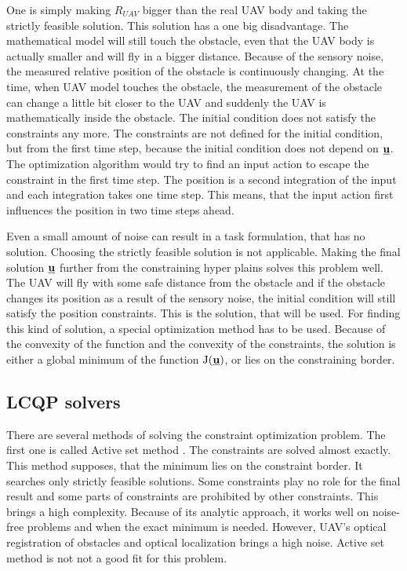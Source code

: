 \documentclass[a4paper,11pt,titlepage]{article}
\newcommand{\uvec}{\textbf{\underline{u}}}
\newcommand{\macJ}{\mathrm{J}(\uvec)}
\begin{document}
One is simply making $R_{UAV}$ bigger than the real UAV body and taking the strictly feasible solution. This solution has a one big disadvantage. The mathematical model will still touch the obstacle, even that the UAV body is actually smaller and will fly in a bigger distance. Because of the sensory noise, the measured relative position of the obstacle is continuously changing. At the time, when UAV model touches the obstacle, the measurement of the obstacle can change a little bit closer to the UAV and suddenly the UAV is mathematically inside the obstacle. The initial condition does not satisfy the constraints any more. The constraints are not defined for the initial condition, but from the first time step, because the initial condition does not depend on $\uvec$. The optimization algorithm would try to find an input action to escape the constraint in the first time step. The position is a second integration of the input and each integration takes one time step. This means, that the input action first influences the position in two time steps ahead. 

Even a small amount of noise can result in a task formulation, that has no solution. Choosing the strictly feasible solution is not applicable. Making the final solution $\uvec$ further from the constraining hyper plains solves this problem well. The UAV will fly with some safe distance from the obstacle and if the obstacle changes its position as a result of the sensory noise, the initial condition will still satisfy the position constraints. This is the solution, that will be used. For finding this kind of solution, a special optimization method has to be used. Because of the convexity of the function and the convexity of the constraints, the solution is either a global minimum of the function $\macJ$, or lies on the constraining border.

\subsection{LCQP solvers}


There are several methods of solving the constraint optimization problem.
The first one is called Active set method \cite{schittkowski1983convergence}. The constraints are solved almost exactly. This method supposes, that the minimum lies on the constraint border. It searches only strictly feasible solutions. Some constraints play no role for the final result and some parts of constraints are prohibited by other constraints. This brings a high complexity. Because of its analytic approach, it works well on noise-free problems and when the exact minimum is needed. However, UAV's optical registration of obstacles and optical localization brings a high noise. Active set method is not not a good fit for this problem.
\end{document}
